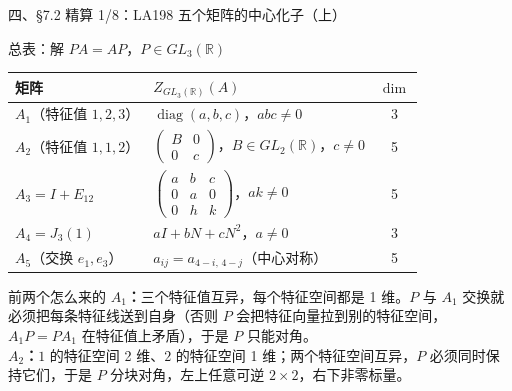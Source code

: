 \documentclass[aspectratio=169,10pt,fontset=none]{ctexbeamer}
\begin{document}
\begin{frame}[t]{四、\S7.2 精算 1/8：LA198 五个矩阵的中心化子（上）}
  \centering
  \begin{block}{\footnotesize 总表：解 $PA=AP$，$P\in GL_3(\mathbb R)$}
    \scriptsize
    \renewcommand{\arraystretch}{1.22}
    \begin{tabular}{@{}l l c@{}}
      \toprule
      矩阵 & $Z_{GL_3(\mathbb R)}(A)$ & $\dim$\\
      \midrule
      $A_1$（特征值 $1,2,3$） & $\operatorname{diag}(a,b,c)$，$abc\ne0$ & 3\\
      $A_2$（特征值 $1,1,2$） & $\begin{pmatrix}B&0\\0&c\end{pmatrix}$，$B\in GL_2(\mathbb R)$，$c\ne0$ & 5\\
      $A_3=I+E_{12}$ & $\begin{pmatrix}a&b&c\\0&a&0\\0&h&k\end{pmatrix}$，$ak\ne0$ & 5\\
      $A_4=J_3(1)$ & $aI+bN+cN^2$，$a\ne0$ & 3\\
      $A_5$（交换 $e_1,e_3$） & $a_{ij}=a_{4-i,\,4-j}$（中心对称） & 5\\
      \bottomrule
    \end{tabular}
  \end{block}
  \raggedright
  \begin{block}{前两个怎么来的}
    \scriptsize
    \textbf{$A_1$：}三个特征值互异，每个特征空间都是 1 维。$P$ 与 $A_1$ 交换就必须把每条特征线送到自身（否则 $P$ 会把特征向量拉到别的特征空间，$A_1P=PA_1$ 在特征值上矛盾），于是 $P$ 只能对角。\\
    \textbf{$A_2$：}$1$ 的特征空间 2 维、$2$ 的特征空间 1 维；两个特征空间互异，$P$ 必须同时保持它们，于是 $P$ 分块对角，左上任意可逆 $2\times2$，右下非零标量。
  \end{block}
\end{frame}
\end{document}
